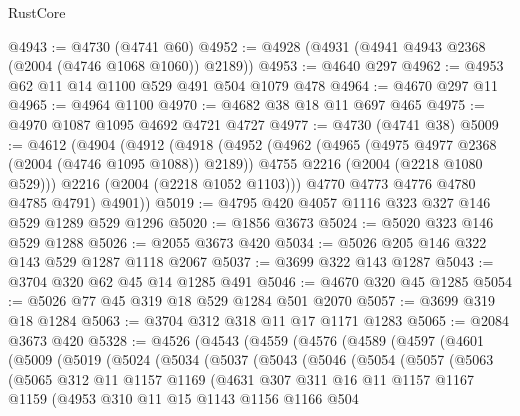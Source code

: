 \begin{lexlean}{RustCore}
\begin{coremodule}
@4943 := @4730 (@4741 @60)
@4952 := @4928 (@4931 (@4941 @4943 @2368 (@2004 (@4746 @1068 @1060)) @2189))
@4953 := @4640 @297
@4962 := @4953 @62 @11 @14 @1100 @529 @491 @504 @1079 @478
@4964 := @4670 @297 @11
@4965 := @4964 @1100
@4970 := @4682 @38 @18 @11 @697 @465
@4975 := @4970 @1087 @1095 @4692 @4721 @4727
@4977 := @4730 (@4741 @38)
@5009 := @4612
    (@4904
      (@4912
        (@4918
          (@4952
            (@4962
              (@4965 (@4975 @4977 @2368 (@2004 (@4746 @1095 @1088)) @2189))
              @4755
              @2216
              (@2004 (@2218 @1080 @529)))
            @2216
            (@2004 (@2218 @1052 @1103)))
          @4770
          @4773
          @4776
          @4780
          @4785
          @4791)
        @4901))
@5019 := @4795 @420 @4057 @1116 @323 @327 @146 @529 @1289 @529 @1296
@5020 := @1856 @3673
@5024 := @5020 @323 @146 @529 @1288
@5026 := @2055 @3673 @420
@5034 := @5026 @205 @146 @322 @143 @529 @1287 @1118 @2067
@5037 := @3699 @322 @143 @1287
@5043 := @3704 @320 @62 @45 @14 @1285 @491
@5046 := @4670 @320 @45 @1285
@5054 := @5026 @77 @45 @319 @18 @529 @1284 @501 @2070
@5057 := @3699 @319 @18 @1284
@5063 := @3704 @312 @318 @11 @17 @1171 @1283
@5065 := @2084 @3673 @420
@5328 := @4526
    (@4543
      (@4559
        (@4576
          (@4589
            (@4597
              (@4601
                (@5009
                  (@5019
                    (@5024
                      (@5034
                        (@5037
                          (@5043
                            (@5046
                              (@5054
                                (@5057
                                  (@5063
                                    (@5065
                                      @312
                                      @11
                                      @1157
                                      @1169
                                      (@4631
                                        @307
                                        @311
                                        @16
                                        @11
                                        @1157
                                        @1167
                                        @1159
                                        (@4953
                                          @310
                                          @11
                                          @15
                                          @1143
                                          @1156
                                          @1166
                                          @504

\end{coremodule}
\end{lexlean}
